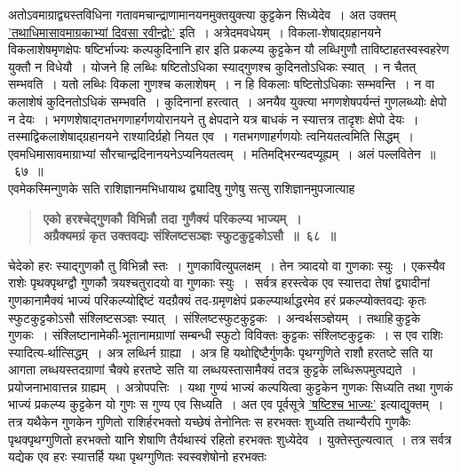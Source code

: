 \documentclass[11pt, openany]{book}
\begin{document}
\begin{sloppypar}
\noindent अतोऽवमाग्राद्व्यस्तविधिना गतावमचान्द्राणामानयनमुक्तयुक्त्या कुट्टकेन सिध्येदेव~। अत उक्तम् \hyperref[5.67]{'तथाधिमासावमाग्रकाभ्यां दिवसा रवीन्द्वोः'} इति~। अत्रेदमवधेयम्~। विकला-शेषाद्ग्रहानयने विकलाशेषमृणक्षेपः षष्टिर्भाज्यः कल्पकुदिनानि हार इति प्रकल्प्य कुट्टकेन यौ लब्धिगुणौ ताविष्टाहतस्वस्वहरेण युक्तौ न विधेयौ~। योजने हि लब्धिः षष्टितोऽधिका स्याद्गुणश्च कुदिनतोऽधिकः स्यात्~। न चैतत् सम्भवति~। यतो लब्धिः विकला गुणश्च कलाशेषम्~। न हि विकलाः षष्टितोऽधिकाः सम्भवन्ति~। न वा कलाशेषं कुदिनतोऽधिकं सम्भवति~। कुदिनानां हरत्वात्~। अनयैव युक्त्या भगणशेषपर्यन्तं गुणलब्ध्योः क्षेपो न देयः~। भगणशेषाद्गतभगणाहर्गणयोरानयने तु क्षेपदाने यत्र बाधकं न स्यात्तत्र तादृशः क्षेपो देयः~। तस्माद्विकलाशेषाद्ग्रहानयने राश्यादिर्ग्रहो नियत एव~। गतभगणाहर्गणयोः त्वनियतत्वमिति सिद्धम्~। एवमधिमासावमाग्राभ्यां सौरचान्द्रदिनानयनेऽप्यनियतत्वम्~। मतिमद्भिरन्यदप्यूह्यम्~। अलं पल्लवितेन~॥~६७~॥\\

{\small एवमेकस्मिन्गुणके सति राशिज्ञानमभिधायाथ द्व्यादिषु गुणेषु सत्सु राशिज्ञानमुपजात्याह\textendash }

 \label{5.68}
\begin{quote}
{\large \textbf{{\color{purple}एको हरश्चेद्गुणकौ विभिन्नौ तदा गुणैक्यं परिकल्प्य भाज्यम्~।\\
अग्रैक्यमग्रं कृत उक्तवद्यः संश्लिष्टसञ्ज्ञः स्फुटकुट्टकोऽसौ~॥~६८~॥}}}
\end{quote}

चेदेको हरः स्याद्गुणकौ तु विभिन्नौ स्तः~। गुणकावित्युपलक्षम्~। तेन त्र्यादयो वा गुणकाः स्युः~। एकस्यैव राशेः पृथक्पृथग्द्वौ गुणकौ त्रयश्चतुरादयो वा गुणकाः स्युः~।~सर्वत्र हरस्त्वेक एव स्यात्तदा तेषां द्व्यादीनां गुणकानामैक्यं भाज्यं परिकल्प्योद्दिष्टं यदग्रैक्यं तद-ग्रमृणक्षेपं प्रकल्प्यार्थाद्धरमेव हरं प्रकल्प्योक्तवद्यः कृतः स्फुटकुट्टकोऽसौ संश्लिष्टसञ्ज्ञः स्यात्~। संश्लिष्टस्फुटकुट्टकः~। अन्वर्थसञ्ज्ञेयम्~। तथाहि\textendash \,कुट्टके गुणकः~। संश्लिष्टानामेकी-भूतानामग्राणां सम्बन्धी स्फुटो विविक्तः कुट्टकः संश्लिष्टकुट्टकः~। स एव राशिः स्यादित्य-र्थात्सिद्धम्~। अत्र लब्धिर्न ग्राह्या~। अत्र हि यथोद्दिष्टैर्गुणकैः पृथग्गुणिते राशौ हरतष्टे सति या आगता लब्धयस्तदग्राणां चैक्ये हरतष्टे सति या लब्धयस्तासामैक्यं तदत्र कुट्टके लब्धिरूपमुत्पद्यते~। प्रयोजनाभावात्तन्न ग्राह्यम्~। अत्रोपपत्तिः~। यथा गुण्यं भाज्यं कल्पयित्वा कुट्टकेन गुणकः सिध्यति तथा गुणकं भाज्यं प्रकल्प्य कुट्टकेन यो गुणः स गुण्य एव सिध्यति~। अत एव पूर्वसूत्रे \hyperref[5.67]{'षष्टिश्च भाज्यः'} इत्याद्युक्तम्~। तत्र यथैकेन गुणकेन गुणितो राशिर्हरभक्तो यच्छेषं तेनोनितः स हरभक्तः शुध्यति तथान्यैरपि गुणकैः पृथक्पृथग्गुणितो हरभक्तो यानि शेषाणि तैर्यथास्वं रहितो हरभक्तः शुध्येदेव~। युक्तेस्तुल्यत्वात्~। तत्र सर्वत्र यद्येक एव हरः स्यात्तर्हि यथा पृथग्गुणितः स्वस्वशेषोनो हरभक्तः
\end{sloppypar}
\end{document}
